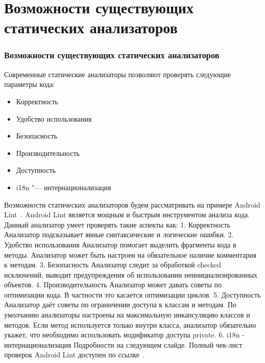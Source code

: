 \documentclass{../industrial-development}
\begin{document}
\section{Возможности существующих статических анализаторов}
\begin{frame} \frametitle{Возможности существующих статических анализаторов}
	\begin{block}{}
		Современные статические анализаторы позволяют проверять следующие параметры кода:
	\end{block}
	\begin{itemize}
		\item Корректность
		\item Удобство использования
		\item Безопасность
		\item Производительность
		\item Доступность
		\item i18n "--- интернационализация
	\end{itemize}
\end{frame}
\lecturenotes
Возможности статических анализаторов будем рассматривать на примере Android Lint~\cite{AndroidLint}. Android Lint является мощным и быстрым инструментом анализа кода. Данный анализатор умеет проверять такие аспекты как:
1. Корректность
Анализатор подсказывает явные синтаксические и логические ошибки.
2. Удобство использования
Анализатор помогает выделить фрагменты кода в методы. Анализатор может быть настроен на обязательное наличие комментария к методам.
3. Безопасность
Анализатор следит за обработкой checked исключений, выводит предупреждения об использовании неинициализированных объектов.
4. Производительность
Анализатор может давать советы по оптимизации кода. В частности это касается оптимизации циклов.
5. Доступность
Анализатор даёт советы по ограничении доступа к классам и методам. По умолчанию анализаторы настроены на максимальную инкапсуляцию классов и методов. Если метод используется только внутри класса, анализатор обязательно укажет, что необходимо использовать модификатор доступа private.
6. i18n - интернационализация
Подробности на следующем слайде.
Полный чек-лист проверок Android Lint доступен по ссылке~\cite{LintChecks}.
\end{document}
